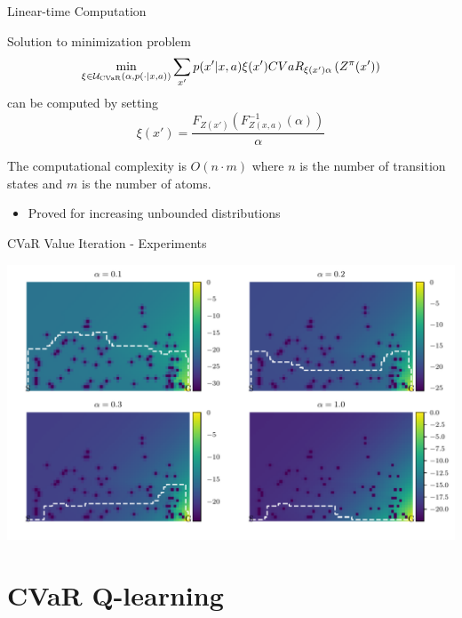 \documentclass{beamer}
\begin{document}

\begin{frame}{Linear-time Computation}

\begin{theorem}
Solution to minimization problem 
$$\min_{\xi \in \mathcal{U}_{\text{CVaR}}(\alpha, p(\cdot | x, a))} \sum_{x'} p(x'| x, a)\xi(x') CVaR_{\xi(x')\alpha}\left( {Z^\pi(x')} \right)$$
can be computed by setting
$$\xi ( x' ) = \dfrac{F_{Z(x')}(F^{-1}_{Z(x,a)}(\alpha))}{\alpha} $$

The computational complexity is $O(n\cdot m)$ where $n$ is the number of transition states and $m$ is the number of atoms.
\end{theorem}

\begin{itemize}
\item Proved for increasing unbounded distributions
\end{itemize}

\end{frame}


\begin{frame}{CVaR Value Iteration - Experiments}

\center
\includegraphics[width=\linewidth]{../gfx/vi_optimal_paths.pdf}

\end{frame}


\section{CVaR Q-learning}
\end{document}
